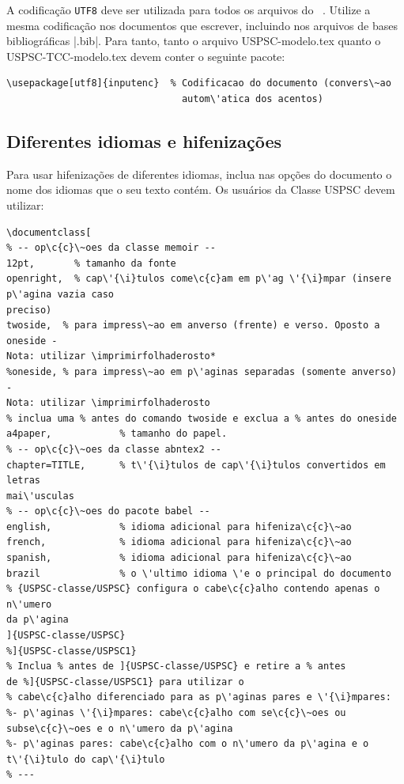 A codifica\c{c}\~ao \texttt{UTF8} deve ser utilizada para todos os arquivos do \abnTeX\ . Utilize a mesma codifica\c{c}\~ao nos documentos que escrever, incluindo nos arquivos de bases bibliogr\'aficas |.bib|. Para tanto, tanto o arquivo USPSC-modelo.tex  quanto o USPSC-TCC-modelo.tex devem conter o seguinte pacote:

\begin{verbatim}
\usepackage[utf8]{inputenc}	 % Codificacao do documento (convers\~ao
                               autom\'atica dos acentos)
\end{verbatim}

\subsection{Diferentes idiomas e hifeniza\c{c}\~oes}
\label{sec-hifenizacao}

Para usar hifeniza\c{c}\~oes de diferentes idiomas, inclua nas op\c{c}\~oes do documento o
nome dos idiomas que o seu texto cont\'em. Os usu\'arios da Classe USPSC devem utilizar:

\begin{verbatim}
\documentclass[
% -- op\c{c}\~oes da classe memoir --
12pt,		% tamanho da fonte
openright,	% cap\'{\i}tulos come\c{c}am em p\'ag \'{\i}mpar (insere p\'agina vazia caso 
preciso)
twoside,  % para impress\~ao em anverso (frente) e verso. Oposto a oneside - 
Nota: utilizar \imprimirfolhaderosto*
%oneside, % para impress\~ao em p\'aginas separadas (somente anverso) -  
Nota: utilizar \imprimirfolhaderosto
% inclua uma % antes do comando twoside e exclua a % antes do oneside 
a4paper,			% tamanho do papel. 
% -- op\c{c}\~oes da classe abntex2 --
chapter=TITLE,		% t\'{\i}tulos de cap\'{\i}tulos convertidos em letras 
mai\'usculas
% -- op\c{c}\~oes do pacote babel --
english,			% idioma adicional para hifeniza\c{c}\~ao
french,				% idioma adicional para hifeniza\c{c}\~ao
spanish,			% idioma adicional para hifeniza\c{c}\~ao
brazil				% o \'ultimo idioma \'e o principal do documento
% {USPSC-classe/USPSC} configura o cabe\c{c}alho contendo apenas o n\'umero 
da p\'agina
]{USPSC-classe/USPSC}
%]{USPSC-classe/USPSC1}
% Inclua % antes de ]{USPSC-classe/USPSC} e retire a % antes 
de %]{USPSC-classe/USPSC1} para utilizar o 
% cabe\c{c}alho diferenciado para as p\'aginas pares e \'{\i}mpares:
%- p\'aginas \'{\i}mpares: cabe\c{c}alho com se\c{c}\~oes ou subse\c{c}\~oes e o n\'umero da p\'agina
%- p\'aginas pares: cabe\c{c}alho com o n\'umero da p\'agina e o t\'{\i}tulo do cap\'{\i}tulo 
% ---
\end{verbatim}

